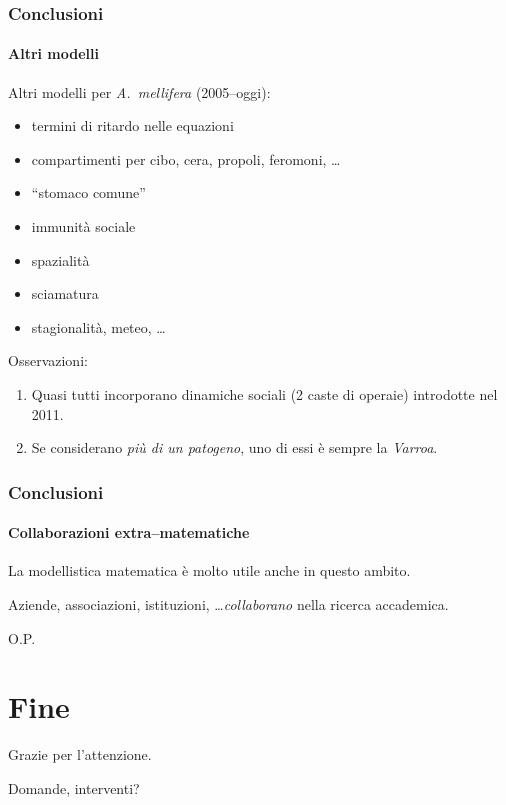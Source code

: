 \documentclass[]{beamer}
\begin{document}
\begin{frame}
    \frametitle{Conclusioni}
    \framesubtitle{Altri modelli}

    Altri modelli per \emph{A.~mellifera} (2005--oggi):
    \begin{itemize}
        \item \pause termini di ritardo nelle equazioni
        \item \pause compartimenti per cibo, cera, propoli, feromoni, \dots
        \item \pause ``stomaco comune''
        \item \pause immunità sociale
        \item \pause spazialità
        \item \pause sciamatura
        \item \pause stagionalità, meteo, \dots
    \end{itemize}

    \pause Osservazioni:
    \begin{enumerate}
        \item Quasi tutti incorporano dinamiche sociali (2 caste di operaie) introdotte nel 2011.
        \item \pause Se considerano \emph{più di un patogeno}, uno di essi è sempre \pause la \emph{Varroa}.
    \end{enumerate}
\end{frame}

\begin{frame}
    \frametitle{Conclusioni}
    \framesubtitle{Collaborazioni extra--matematiche}

    La modellistica matematica è molto utile anche in questo ambito.

    \pause
    \vspace{1em}
    Aziende, associazioni, istituzioni, \dots \emph{collaborano} nella ricerca accademica.

    \pause
    \vspace{1em}
    O.P.
\end{frame}


\section{Fine}


\begin{frame}

    \vspace{4em}
    \centering
    Grazie per l'attenzione.

    \vspace{4em}
    Domande, interventi?
\end{frame}
\end{document}
